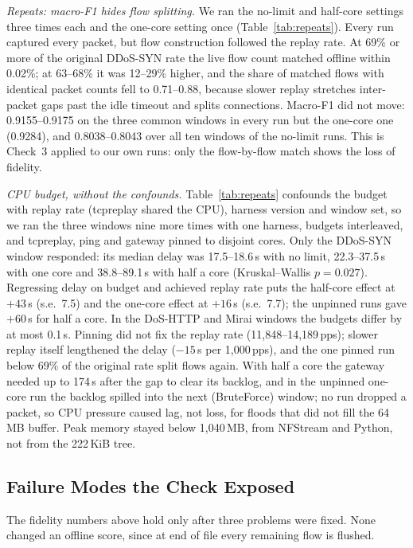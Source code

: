 \emph{Repeats: macro-F1 hides flow splitting.} We ran the no-limit and half-core settings three times each and the one-core setting once (Table~\ref{tab:repeats}). Every run captured every packet, but flow construction followed the replay rate. At 69\% or more of the original DDoS-SYN rate the live flow count matched offline within 0.02\%; at 63--68\% it was 12--29\% higher, and the share of matched flows with identical packet counts fell to 0.71--0.88, because slower replay stretches inter-packet gaps past the idle timeout and splits connections. Macro-F1 did not move: 0.9155--0.9175 on the three common windows in every run but the one-core one (0.9284), and 0.8038--0.8043 over all ten windows of the no-limit runs. This is Check~3 applied to our own runs: only the flow-by-flow match shows the loss of fidelity.

\emph{CPU budget, without the confounds.} Table~\ref{tab:repeats} confounds the budget with replay rate (tcpreplay shared the CPU), harness version and window set, so we ran the three windows nine more times with one harness, budgets interleaved, and tcpreplay, ping and gateway pinned to disjoint cores. Only the DDoS-SYN window responded: its median delay was 17.5--18.6\,s with no limit, 22.3--37.5\,s with one core and 38.8--89.1\,s with half a core (Kruskal--Wallis $p=0.027$). Regressing delay on budget and achieved replay rate puts the half-core effect at $+43$\,s (s.e.\ 7.5) and the one-core effect at $+16$\,s (s.e.\ 7.7); the unpinned runs gave $+60$\,s for half a core. In the DoS-HTTP and Mirai windows the budgets differ by at most 0.1\,s. Pinning did not fix the replay rate (11,848--14,189\,pps); slower replay itself lengthened the delay ($-15$\,s per 1,000\,pps), and the one pinned run below 69\% of the original rate split flows again. With half a core the gateway needed up to 174\,s after the gap to clear its backlog, and in the unpinned one-core run the backlog spilled into the next (BruteForce) window; no run dropped a packet, so CPU pressure caused lag, not loss, for floods that did not fill the 64\,MB buffer. Peak memory stayed below 1,040\,MB, from NFStream and Python, not from the 222\,KiB tree.

\subsection{Failure Modes the Check Exposed}\label{sec:defect}

The fidelity numbers above hold only after three problems were fixed. None changed an offline score, since at end of file every remaining flow is flushed.

